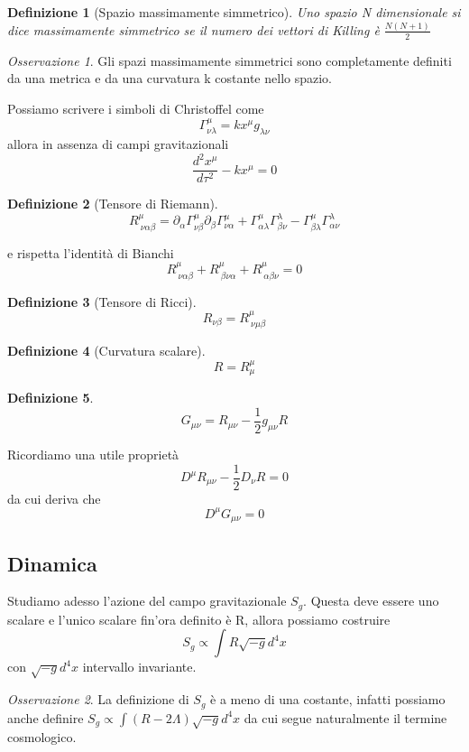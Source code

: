 \documentclass[10pt,a4paper]{article}
\let\oldmarginpar\marginpar
\renewcommand\marginpar[1]{\-\oldmarginpar[\raggedleft\footnotesize #1]%
	{\raggedright\footnotesize #1}}
\theoremstyle{break}
\newtheorem{defn}{Definizione}
\theoremstyle{remark}
\newtheorem{oss}{Osservazione}
\theoremstyle{definition}
\begin{document}
\begin{defn}[Spazio massimamente simmetrico]
	Uno spazio N dimensionale si dice massimamente simmetrico se il numero dei vettori di Killing è $\frac{N(N+1)}{2}$
\end{defn}

\begin{oss}
	Gli spazi massimamente simmetrici sono completamente definiti da una metrica e da una curvatura k costante nello spazio.
\end{oss}

\marginpar{Q. ?}

Possiamo scrivere i simboli di Christoffel come 
\[
\Gamma^\mu_{\nu \lambda} = k x^\mu g_{\lambda \nu}
\]
allora in assenza di campi gravitazionali 
\[
\frac{d^2 x^\mu}{d\tau^2} - k x^\mu = 0
\]

\begin{defn}[Tensore di Riemann]
	\[
	R^\mu_{~\nu \alpha \beta} = \partial_\alpha \Gamma^\mu_{\nu \beta} \partial_\beta \Gamma^\mu_{\nu \alpha} + \Gamma^\mu_{\alpha \lambda}\Gamma^\lambda_{\beta \nu} - \Gamma^\mu_{\beta \lambda}\Gamma^\lambda_{\alpha \nu}
	\]
\end{defn}
e rispetta l'identità di Bianchi
\[
R^\mu_{~\nu \alpha \beta} + R^\mu_{~ \beta \nu \alpha } + R^\mu_{~\alpha \beta \nu  } = 0
\]
\begin{defn}[Tensore di Ricci]
	\[
	R_{\nu \beta} = R^\mu_{~\nu \mu \beta}
	\]
\end{defn}

\begin{defn}[Curvatura scalare]
	\[
	R = R^\mu_\mu
	\]
\end{defn}
\begin{defn}
	\[
	G_{\mu \nu} = R_{\mu \nu} - \frac12 g_{\mu \nu} R
	\]
\end{defn}
Ricordiamo una utile proprietà
\[
D^\mu R_{\mu \nu} - \frac12 D_\nu R = 0
\]
da cui deriva che 
\[
D^\mu G_{\mu \nu} = 0
\]
\subsection{Dinamica}
Studiamo adesso l'azione del campo gravitazionale $S_g$. Questa deve essere uno scalare e l'unico scalare fin'ora definito è R, allora possiamo costruire 
\[
\boxed{
S_g \propto \int R \sqrt{-g}d^4x
}
\]
con $ \sqrt{-g}d^4x$ intervallo invariante.
\begin{oss}
	La definizione di $S_g$ è a meno di una costante, infatti possiamo anche definire $S_g \propto \int (R - 2\Lambda) \sqrt{-g}d^4x$ da cui segue naturalmente il termine cosmologico.
\end{oss}
\end{document}
